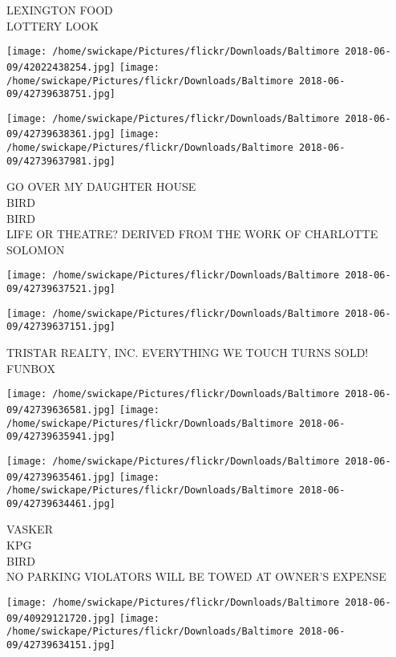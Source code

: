 \documentclass[10pt,letterpaper]{article}
\begin{document}
LEXINGTON FOOD\\
LOTTERY LOOK\\
\pagebreak

\texttt{[image: /home/swickape/Pictures/flickr/Downloads/Baltimore 2018-06-09/42022438254.jpg]}
\texttt{[image: /home/swickape/Pictures/flickr/Downloads/Baltimore 2018-06-09/42739638751.jpg]}

\texttt{[image: /home/swickape/Pictures/flickr/Downloads/Baltimore 2018-06-09/42739638361.jpg]}
\texttt{[image: /home/swickape/Pictures/flickr/Downloads/Baltimore 2018-06-09/42739637981.jpg]}

GO OVER MY DAUGHTER HOUSE\\
BIRD\\
BIRD\\
LIFE OR THEATRE? DERIVED FROM THE WORK OF CHARLOTTE SOLOMON\\
\pagebreak

\texttt{[image: /home/swickape/Pictures/flickr/Downloads/Baltimore 2018-06-09/42739637521.jpg]}

\vspace{0.25in}
\texttt{[image: /home/swickape/Pictures/flickr/Downloads/Baltimore 2018-06-09/42739637151.jpg]}

TRISTAR REALTY, INC. EVERYTHING WE TOUCH TURNS SOLD!\\
FUNBOX\\
\pagebreak

\texttt{[image: /home/swickape/Pictures/flickr/Downloads/Baltimore 2018-06-09/42739636581.jpg]}
\texttt{[image: /home/swickape/Pictures/flickr/Downloads/Baltimore 2018-06-09/42739635941.jpg]}

\texttt{[image: /home/swickape/Pictures/flickr/Downloads/Baltimore 2018-06-09/42739635461.jpg]}
\texttt{[image: /home/swickape/Pictures/flickr/Downloads/Baltimore 2018-06-09/42739634461.jpg]}

VASKER\\
KPG\\
BIRD\\
NO PARKING VIOLATORS WILL BE TOWED AT OWNER'S EXPENSE\\
\pagebreak

\texttt{[image: /home/swickape/Pictures/flickr/Downloads/Baltimore 2018-06-09/40929121720.jpg]}
\texttt{[image: /home/swickape/Pictures/flickr/Downloads/Baltimore 2018-06-09/42739634151.jpg]}
\end{document}
